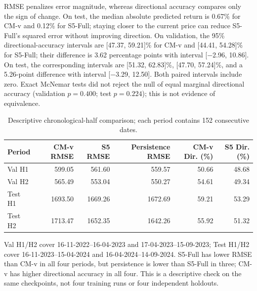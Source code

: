 \documentclass[13pt,a4paper,oneside]{report}
\begin{document}
RMSE penalizes error magnitude, whereas directional accuracy compares only the sign of change. On
test, the median absolute predicted return is \num{0.67}\% for CM-v and \num{0.12}\% for S5-Full;
staying closer to the current price can reduce S5-Full's squared error without improving direction.
On validation, the 95\% directional-accuracy intervals are [\num{47.37}, \num{59.21}]\% for CM-v
and [\num{44.41}, \num{54.28}]\% for S5-Full; their difference is \num{3.62} percentage points
with interval [\num{-2.96}, \num{10.86}]. On test, the corresponding intervals are
[\num{51.32}, \num{62.83}]\%, [\num{47.70}, \num{57.24}]\%, and a \num{5.26}-point difference
with interval [\num{-3.29}, \num{12.50}]. Both paired intervals include zero. Exact McNemar tests
did not reject the null of equal marginal directional accuracy (validation $p=\num{0.400}$; test
$p=\num{0.224}$); this is not evidence of equivalence.

\begin{table}[H]
\centering
\caption{Descriptive chronological-half comparison; each period contains 152 consecutive dates.}
\label{tab:temporal-stability}
{\scriptsize
\begin{tabular}{@{}lrrrrr@{}}
\toprule
\textbf{Period} & \textbf{CM-v RMSE} & \textbf{S5 RMSE} & \textbf{Persistence RMSE} & \textbf{CM-v Dir. (\%)} & \textbf{S5 Dir. (\%)} \\
\midrule
Val H1 & \num{599.05} & \num{561.60} & \num{559.57} & \num{50.66} & \num{48.68} \\
Val H2 & \num{565.49} & \num{553.04} & \num{550.27} & \num{54.61} & \num{49.34} \\
Test H1 & \num{1693.50} & \num{1669.26} & \num{1672.69} & \num{59.21} & \num{53.29} \\
Test H2 & \num{1713.47} & \num{1652.35} & \num{1642.26} & \num{55.92} & \num{51.32} \\
\bottomrule
\end{tabular}}
\end{table}

Val H1/H2 cover 16-11-2022--16-04-2023 and 17-04-2023--15-09-2023; Test H1/H2 cover
16-11-2023--15-04-2024 and 16-04-2024--14-09-2024. S5-Full has lower RMSE than CM-v in all four
periods, but persistence is lower than S5-Full in three; CM-v has higher directional accuracy in all
four. This is a descriptive check on the same checkpoints, not four training runs or four independent
holdouts.
\end{document}
